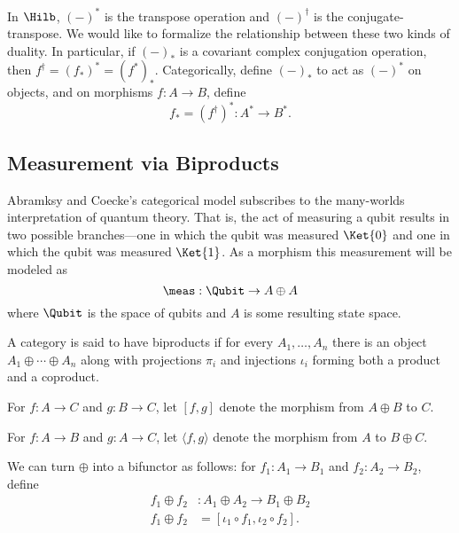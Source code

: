 In $\Hilb$, $(-)^*$ is the transpose operation and $(-)^\dagger$ is the conjugate-transpose.
We would like to formalize the relationship between these two kinds of duality. 
In particular, if $(-)_*$ is a covariant complex conjugation operation, then 
$f^\dagger = (f_*)^* = (f^*)_*$. Categorically, define $(-)_*$ to act as $(-)^*$ on objects, 
and on morphisms $f: A \rightarrow B$, define 
\[ f_* = (f^\dagger)^* : A^* \rightarrow B^*. \]

\subsection{Measurement via Biproducts}

Abramksy and Coecke's categorical model subscribes to the many-worlds interpretation of quantum
theory. That is, the act of measuring a qubit results in two possible branches---one in 
which the qubit was measured $\Ket{0}$ and one in which the qubit was measured $\Ket{1}$.
As a morphism this measurement will be modeled as
\[ \meas : \Qubit \rightarrow A \oplus A \]
where $\Qubit$ is the space of qubits and $A$ is some resulting state space.

\begin{definition}
    A category is said to have biproducts if for every $A_1,\ldots,A_n$
    there is an object $A_1 \oplus \cdots \oplus A_n$ along with
    projections $\pi_i$ and injections $\iota_i$ forming both a product and a coproduct.
    
    For $f : A \rightarrow C$ and $g : B \rightarrow C$, let $[f,g]$
    denote the morphism from $A \oplus B$ to $C$.

    For $f : A \rightarrow B$ and $g : A \rightarrow C$, let $\langle f,g\rangle$ denote
    the morphism from $A$ to $B \oplus C$.
\end{definition}

We can turn $\oplus$ into a bifunctor as follows: for $f_1:A_1 \rightarrow B_1$
and $f_2 : A_2 \rightarrow B_2$, define 
\begin{align*}
    f_1 \oplus f_2 &: A_1 \oplus A_2 \rightarrow B_1 \oplus B_2 \\
    f_1 \oplus f_2 &= [\iota_1 \circ f_1, \iota_2 \circ f_2].
\end{align*}

